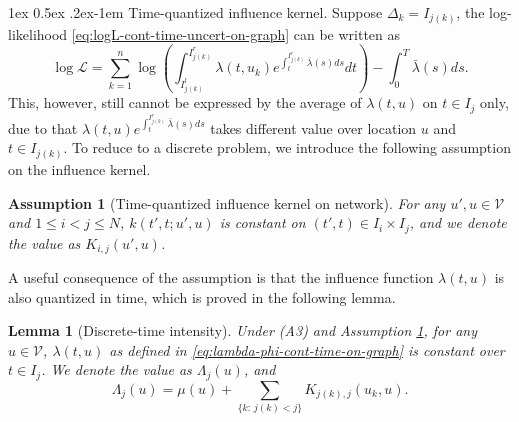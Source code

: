 \documentclass[11pt]{article}
\makeatletter
\newtheorem{lemma}[theorem]{Lemma}
\newtheorem{assumption}{Assumption}
\theoremstyle{remark}
\theoremstyle{plain}
\newcommand{\calL}{\mathcal{L}}
\newcommand{\calV}{\mathcal{V}}
\renewcommand{\paragraph}{%
  \@startsection{paragraph}{4}%
  {\z@}{1ex \@plus 0.5ex \@minus .2ex}{-1em}%
  {\normalfont\normalsize\itshape}%
}
\makeatother
\begin{document}
\paragraph{Time-quantized influence kernel.}
Suppose $\Delta_k = I_{j(k)}$, the log-likelihood \eqref{eq:logL-cont-time-uncert-on-graph} can be written as
\begin{equation}\label{eq:logL-cont-time-uncert-on-graph-A3}
\log \calL = \sum_{k=1}^n \log \left( \int_{I_{j(k)}^l}^{I_{j(k)}^r} \lambda( t, u_k) e^{ \int_t^{I_{j(k)}^r}  \bar{\lambda} (s) ds} dt
		\right) - \int_0^T \bar{\lambda}(s) ds.
\end{equation}
This, however, still cannot be expressed by the average of $\lambda(t,u)$ on $t\in I_j$ only,
due to that $\lambda( t, u) e^{ \int_t^{I_{j(k)}^r}  \bar{\lambda} (s) ds}$ takes different value over location $u$ and $t \in I_{j(k)}$.
%
To reduce to a discrete problem, we introduce the following assumption on the influence kernel.

\begin{assumption}[Time-quantized influence kernel on network]\label{assump:A4}
For any $u', u \in \calV$ and $ 1 \le i < j \le N $, 
$k(t', t; u', u)$ is constant on $(t',t) \in I_i \times I_j$, and we denote the value as $K_{i,j}(u', u)$.
\end{assumption}
A useful consequence of the assumption is that the influence function $\lambda(t,u)$ is also quantized in time, which is proved in the following lemma.

\begin{lemma}[Discrete-time intensity]\label{lemma:quant-time-lambda(t,u)}
Under (A3) and Assumption \ref{assump:A4}, %
for any $u \in \calV$, $\lambda(t,u)$ as defined in \eqref{eq:lambda-phi-cont-time-on-graph} is constant over $t \in I_j$.
We denote the value as $\Lambda_j(u)$, and
\begin{equation}\label{eq:Lambdaj-base-on-graph}
\Lambda_j  (u) = \mu(u) +  \sum_{\{k: \, j(k) < j\} }  K_{j(k), j}(u_k, u).
\end{equation}
\end{lemma}
\end{document}
